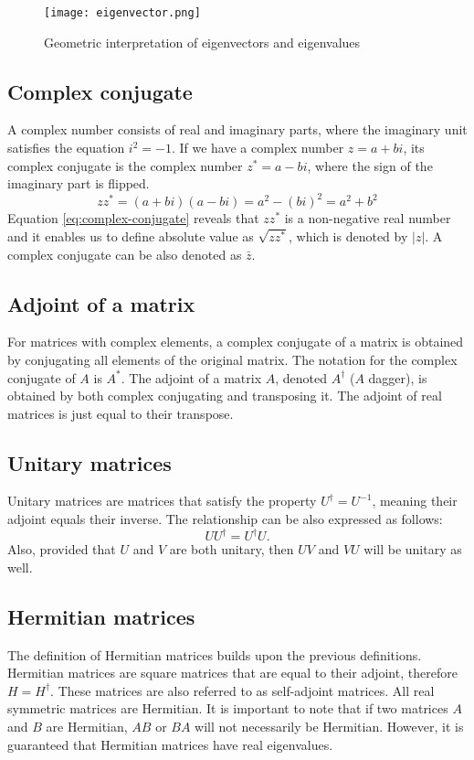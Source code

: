 \begin{figure}[H]
  \centering
  \texttt{[image: eigenvector.png]}
  \caption{Geometric interpretation of eigenvectors and eigenvalues \cite{img:eigen}}
  \label{fig:eigen}
\end{figure} 

\tocless\subsection{Complex conjugate}\noindent
A complex number consists of real and imaginary parts, where the imaginary unit satisfies the equation $i^2 = -1$. If we have a complex number $z = a + bi$, its complex conjugate is the complex number $z^{*} = a - bi$, where the sign of the imaginary part is flipped.
\begin{equation}\label{eq:complex-conjugate}
zz^{*} = (a + bi)(a - bi) = a^2 - (bi)^2 = a^2 + b^2
\end{equation}
Equation \ref{eq:complex-conjugate} reveals that $zz^{*}$ is a non-negative real number and it enables us to define absolute value as $\sqrt{zz^{*}}$, which is denoted by $\lvert z \rvert$. A complex conjugate can be also denoted as $\bar{z}$.

\tocless\subsection{Adjoint of a matrix}\noindent
For matrices with complex elements, a complex conjugate of a matrix is obtained by conjugating all elements of the original matrix. The notation for the complex conjugate of $A$ is $A^*$. The adjoint of a matrix $A$, denoted $A^\dag$ ($A$ dagger), is obtained by both complex conjugating and transposing it. The adjoint of real matrices is just equal to their transpose.

\tocless\subsection{Unitary matrices}\noindent
Unitary matrices are matrices that satisfy the property $U^\dag = U^{-1}$, meaning their adjoint equals their inverse. The relationship can be also expressed as follows:
\begin{equation}
U U^{\dag} = U^{\dag} U\text{.}
\end{equation}
Also, provided that $U$ and $V$ are both unitary, then $UV$ and $VU$ will be unitary as well.

\tocless\subsection{Hermitian matrices}\noindent
The definition of Hermitian matrices builds upon the previous definitions. Hermitian matrices are square matrices that are equal to their adjoint, therefore $H = H^\dag$. These matrices are also referred to as self-adjoint matrices. All real symmetric matrices are Hermitian. It is important to note that if two matrices $A$ and $B$ are Hermitian, $AB$ or $BA$ will not necessarily be Hermitian. However, it is guaranteed that Hermitian matrices have real eigenvalues.

